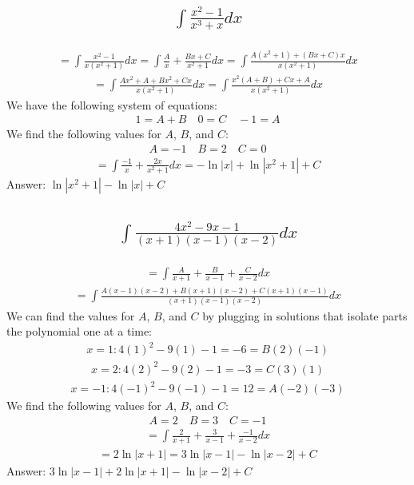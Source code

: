 \documentclass{article}
\begin{document}
\subsection{
	\begin{align*}
		\int{\frac{x^2 - 1}{x^3 + x} dx}
	\end{align*}
}
\begin{align*}
	= \int{\frac{x^2 - 1}{x(x^2 + 1)}dx} = \int{\frac{A}{x} + \frac{Bx + C}{x^2 + 1}dx} = \int{\frac{A(x^2 + 1) + (Bx + C)x}{x(x^2 + 1)}dx}
\end{align*}
\begin{align*}
	= \int{\frac{Ax^2 + A + Bx^2 + Cx}{x(x^2 + 1)}dx} = \int{\frac{x^2(A + B) + Cx + A}{x(x^2 + 1)}dx}
\end{align*}
We have the following system of equations:
\begin{align*}
	1 = A + B \quad 0 = C \quad -1 = A
\end{align*}
We find the following values for $A$, $B$, and $C$:
\begin{align*}
	A = -1 \quad B = 2 \quad C = 0
\end{align*}
\begin{align*}
	= \int{\frac{-1}{x} + \frac{2x}{x^2 + 1}dx} = -\ln{|x|} + \ln{|x^2 + 1|} + C
\end{align*}
Answer: $\ln{|x^2 + 1|} - \ln{|x|} + C$

\subsection{
	\begin{align*}
		\int{\frac{4x^2 - 9x - 1}{(x + 1)(x - 1)(x - 2)} dx}
	\end{align*}
}
\begin{align*}
	= \int{\frac{A}{x + 1} + \frac{B}{x - 1} + \frac{C}{x - 2}dx}
\end{align*}
\begin{align*}
	= \int{\frac{A(x - 1)(x - 2) + B(x + 1)(x - 2) + C(x + 1)(x - 1)}{(x + 1)(x - 1)(x - 2)}dx}
\end{align*}
We can find the values for $A$, $B$, and $C$ by plugging in solutions that isolate parts the polynomial one at a time:
\begin{align*}
	x = 1: 4(1)^2 - 9(1) - 1 = -6 = B(2)(-1)
\end{align*}
\begin{align*}
	x = 2: 4(2)^2 - 9(2) - 1 = -3 = C(3)(1)
\end{align*}
\begin{align*}
	x = -1: 4(-1)^2 - 9(-1) - 1 = 12 = A(-2)(-3)
\end{align*}
We find the following values for $A$, $B$, and $C$:
\begin{align*}
	A = 2 \quad B = 3 \quad C = -1
\end{align*}
\begin{align*}
	= \int{\frac{2}{x + 1} + \frac{3}{x - 1} + \frac{-1}{x - 2}dx}
\end{align*}
\begin{align*}
	= 2\ln{|x + 1|} = 3\ln{|x - 1|} - \ln{|x - 2|} + C
\end{align*}
Answer: $3 \ln{|x - 1|} + 2 \ln{|x + 1|} - \ln{|x - 2|} + C$
\end{document}

